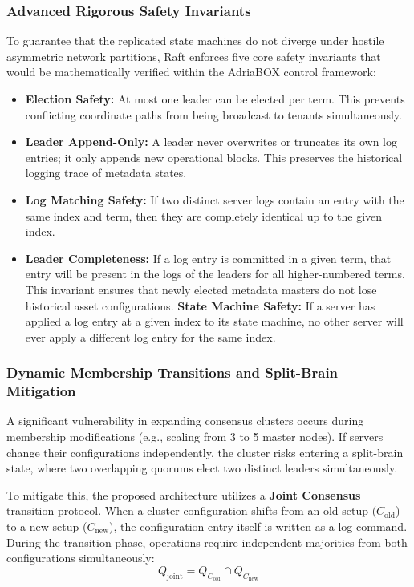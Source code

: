 \subsubsection{Advanced Rigorous Safety Invariants}
To guarantee that the replicated state machines do not diverge under hostile asymmetric network partitions, Raft enforces five core safety invariants that would be mathematically verified within the AdriaBOX control framework:
\begin{itemize}
    \item \textbf{Election Safety:} At most one leader can be elected per term. This prevents conflicting coordinate paths from being broadcast to tenants simultaneously.
    \item \textbf{Leader Append-Only:} A leader never overwrites or truncates its own log entries; it only appends new operational blocks. This preserves the historical logging trace of metadata states.
    \item \textbf{Log Matching Safety:} If two distinct server logs contain an entry with the same index and term, then they are completely identical up to the given index.
    \item \textbf{Leader Completeness:} If a log entry is committed in a given term, that entry will be present in the logs of the leaders for all higher-numbered terms. This invariant ensures that newly elected metadata masters do not lose historical asset configurations.
    \textbf{State Machine Safety:} If a server has applied a log entry at a given index to its state machine, no other server will ever apply a different log entry for the same index.
\end{itemize}

\subsubsection{Dynamic Membership Transitions and Split-Brain Mitigation}
A significant vulnerability in expanding consensus clusters occurs during membership modifications (e.g., scaling from 3 to 5 master nodes). If servers change their configurations independently, the cluster risks entering a split-brain state, where two overlapping quorums elect two distinct leaders simultaneously.

To mitigate this, the proposed architecture utilizes a \textbf{Joint Consensus} transition protocol. When a cluster configuration shifts from an old setup ($C_{\text{old}}$) to a new setup ($C_{\text{new}}$), the configuration entry itself is written as a log command. During the transition phase, operations require independent majorities from both configurations simultaneously:
$$Q_{\text{joint}} = Q_{C_{\text{old}}} \cap Q_{C_{\text{new}}}$$

